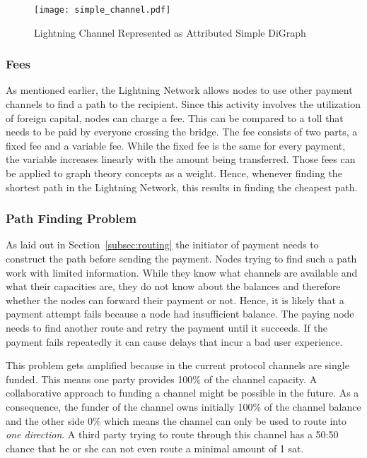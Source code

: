 \documentclass[final]{fhnwreport}       %
\begin{document}
\begin{figure}[H]
\centering
\texttt{[image: simple\_channel.pdf]}
\caption{Lightning Channel Represented as Attributed Simple DiGraph}
\label{fig:channel_graph}
\end{figure}

\subsubsection{Fees}
As mentioned earlier, the Lightning Network allows nodes to use other payment channels to find a path to the recipient. Since this activity involves the utilization of foreign capital, nodes can charge a fee. This can be compared to a toll that needs to be paid by everyone crossing the bridge. The fee consists of two parts, a fixed fee and a variable fee. While the fixed fee is the same for every payment, the variable increases linearly with the amount being transferred. Those fees can be applied to graph theory concepts as a weight. Hence, whenever finding the shortest path in the Lightning Network, this results in finding the cheapest path.

\subsubsection{Path Finding Problem}\label{subsubsec:pproblem}
As laid out in Section~\ref{subsec:routing} the initiator of payment needs to construct the path before sending the payment. Nodes trying to find such a path work with limited information. While they know what channels are available and what their capacities are, they do not know about the balances and therefore whether the nodes can forward their payment or not. Hence, it is likely that a payment attempt fails because a node had insufficient balance. The paying node needs to find another route and retry the payment until it succeeds. If the payment fails repeatedly it can cause delays that incur a bad user experience.

This problem gets amplified because in the current protocol channels are single funded. This means one party provides 100\% of the channel capacity. A collaborative approach to funding a channel might be possible in the future. As a consequence, the funder of the channel owns initially 100\% of the channel balance and the other side 0\% which means the channel can only be used to route into \emph{one direction}. A third party trying to route through this channel has a 50:50 chance that he or she can not even route a minimal amount of 1 sat. 
\end{document}

